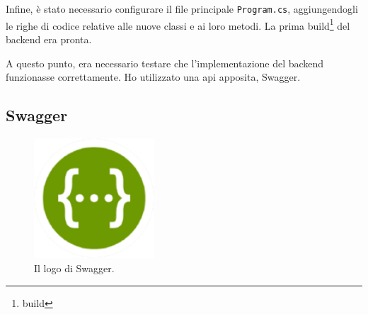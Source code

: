 Infine, è stato necessario configurare il file principale \texttt{Program.cs}, aggiungendogli le righe di codice relative alle nuove classi e ai loro metodi. La prima build\footnote{\glsdesc{build}} del backend era pronta.\newline

A questo punto, era necessario testare che l'implementazione del backend funzionasse correttamente. Ho utilizzato una \acrshort{api} apposita, Swagger.

\subsection{Swagger}\label{subsec:swagger}
\begin{figure}[H]
\centering
\includegraphics[width=0.4\textwidth]{Images/Swagger-logo.png}
\caption{\label{fig:swaggerlogo}Il logo di Swagger.}
\end{figure}

